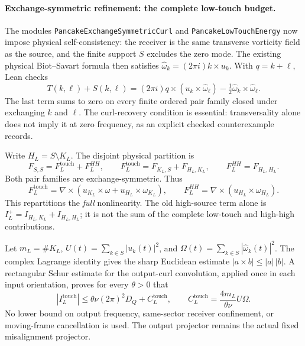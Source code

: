 \documentclass[11pt]{article}
\theoremstyle{definition}
\begin{document}
\paragraph{Exchange-symmetric refinement: the complete low-touch budget.}
The modules \texttt{PancakeExchangeSymmetricCurl} and
\texttt{PancakeLowTouchEnergy} now impose physical self-consistency:
the receiver is the same transverse vorticity field as the source, and
the finite support $S$ excludes the zero mode.  The existing physical
Biot--Savart formula then satisfies
$\widehat\omega_k=(2\pi i)k\times u_k$.  With $q=k+\ell$, Lean checks
\[
 T(k,\ell)+S(k,\ell)
  =(2\pi i)q\times(u_k\times\widehat\omega_\ell)
    -\tfrac12\widehat\omega_k\times\widehat\omega_\ell.
\]
The last term sums to zero on every finite ordered pair family closed
under exchanging $k$ and $\ell$.  The curl-recovery condition is essential:
transversality alone does not imply it at zero frequency, as an explicit
checked counterexample records.

Write $H_L=S\setminus K_L$.  The disjoint physical partition is
\[
 F_{S,S}=F_L^{\mathrm{touch}}+F_L^{HH},\qquad
 F_L^{\mathrm{touch}}=F_{K_L,S}+F_{H_L,K_L},\qquad
 F_L^{HH}=F_{H_L,H_L}.
\]
Both pair families are exchange-symmetric.  Thus
\[
 F_L^{\mathrm{touch}}
   =\nabla\times(u_{K_L}\times\omega+u_{H_L}\times\omega_{K_L}),
 \qquad
 F_L^{HH}=\nabla\times(u_{H_L}\times\omega_{H_L}).
\]
This repartitions the \emph{full} nonlinearity.  The old high-source
term alone is $I_L^+=I_{H_L,K_L}+I_{H_L,H_L}$; it is not the sum of
the complete low-touch and high-high contributions.

Let $m_L=\#K_L$, $U(t)=\sum_{k\in S}|u_k(t)|^2$, and
$\Omega(t)=\sum_{k\in S}|\widehat\omega_k(t)|^2$.
The complex Lagrange identity gives the sharp Euclidean estimate
$|a\times b|\le |a|\,|b|$.  A rectangular Schur estimate for the
output-curl convolution, applied once in each input orientation, proves
for every $\theta>0$ that
\begin{equation}\label{eq:ns-low-touch-absorption}
 |I_L^{\mathrm{touch}}|
 \le \theta\nu(2\pi)^2D_Q+C_L^{\mathrm{touch}},\qquad
 C_L^{\mathrm{touch}}=\frac{4m_L}{\theta\nu}U\Omega.
\end{equation}
No lower bound on output frequency, same-sector receiver confinement,
or moving-frame cancellation is used.  The output projector remains the
actual fixed misalignment projector.
\end{document}
